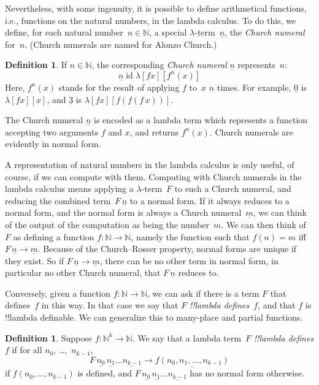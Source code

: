 \documentclass[10pt,a4paper]{article}
\theoremstyle{plain}
\theoremstyle{definition}
\newtheorem{defn}[thm]{Definition}
\theoremstyle{remark}
\providecommand{\num}[1]{\underline{#1}}
\providecommand{\Nat}{\ensuremath{\mathbb{N}}}
\providecommand{\lambd}{\ensuremath{\lambda}}
\providecommand{\ident}{\operatorname{id}}
\providecommand{\red}{\mathrel{\rightarrow}}
\begin{document}
Nevertheless, with some ingenuity, it is possible to define
arithmetical functions, i.e., functions on the natural numbers, in the
lambda calculus. To do this, we define, for each natural number~$n \in
\Nat$, a special $\lambd$-term~$\num n$, the \emph{Church numeral}
for~$n$. (Church numerals are named for Alonzo Church.)

\begin{defn}
  If $n \in \Nat$, the corresponding \emph{Church numeral} $\num{n}$
  represents~$n$:
  \[
    \num{n} \ident \lambd[fx][f^n(x)]
  \]
  Here, $f^n(x)$ stands for the result of applying $f$ to~$x$ $n$
  times. For example, $\num{0}$ is $\lambd[fx][x]$, and $\num{3}$ is
  $\lambd[fx][f(f(f\,x))]$.
\end{defn}
  
The Church numeral $\num n$ is encoded as a lambda term which
represents a function accepting two arguments $f$ and $x$, and
returns $f^n(x)$. Church numerals are evidently in normal form.

A representation of natural numbers in the lambda calculus is only
useful, of course, if we can compute with them.  Computing with Church
numerals in the lambda calculus means applying a $\lambd$-term~$F$ to
such a Church numeral, and reducing the combined term~$F\, \num n$ to
a normal form. If it always reduces to a normal form, and the normal
form is always a Church numeral~$\num m$, we can think of the output
of the computation as being the number~$m$. We can then think of~$F$
as defining a function $f\colon \Nat \to \Nat$, namely the function
such that $f(n) = m$ iff $F\, \num n \red \num m$. Because of the
Church--Rosser property, normal forms are unique if they exist. So if
$F\, \num n \red \num m$, there can be no other term in normal form,
in particular no other Church numeral, that $F \, \num n$ reduces to.

Conversely, given a function $f\colon \Nat \to \Nat$,
we can ask if there is a term $F$ that defines~$f$ in this way. In
that case we say that $F$ \emph{!!{lambda define}s}~$f$, and that $f$ is
!!{lambda definable}. We can generalize this to many-place and partial
functions.

\begin{defn}
Suppose $f\colon \Nat^k \to \Nat$. We say that a lambda term~$F$
\emph{!!{lambda define}s} $f$ if for all 
$n_0$, \dots,~$n_{k-1}$,
\[
F \, \num{n_0} \, \num{n_1} \dots \num{n_{k-1}} \red \num{f(n_0, n_1, \dots,
  n_{k-1})}
\]
if $f(n_0, \dots, n_{k-1})$ is defined, and $F \, \num{n_0} \,
\num{n_1} \dots \num{n_{k-1}}$ has no normal form otherwise.
\end{defn}
\end{document}
